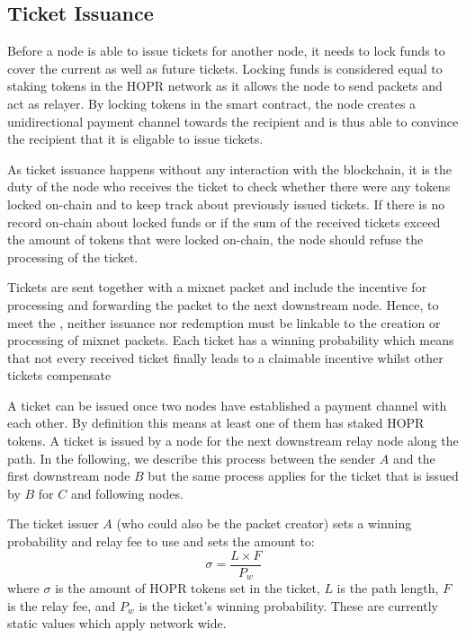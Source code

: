\subsection{Ticket Issuance}
\label{sec:tickets:issuance}

Before a node is able to issue tickets for another node, it needs to lock funds to cover the current as well as future tickets. Locking funds is considered equal to staking tokens in the HOPR network as it allows the node to send packets and act as relayer. By locking tokens in the smart contract, the node creates a unidirectional payment channel towards the recipient and is thus able to convince the recipient that it is eligable to issue tickets.

As ticket issuance happens without any interaction with the blockchain, it is the duty of the node who receives the ticket to check whether there were any tokens locked on-chain and to keep track about previously issued tickets. If there is no record on-chain about locked funds or if the sum of the received tickets exceed the amount of tokens that were locked on-chain, the node should refuse the processing of the ticket.

Tickets are sent together with a mixnet packet and include the incentive for processing and forwarding the packet to the next downstream node. Hence, to meet the , neither issuance nor redemption must be linkable to the creation or processing of mixnet packets.
Each ticket has a winning probability which means that not every received ticket finally leads to a claimable incentive whilst other tickets compensate

A ticket can be issued once two nodes have established a payment channel with each other. By definition this means at least one of them has staked HOPR tokens. A ticket is issued by a node for the next downstream relay node along the path. In the following, we describe this process between the sender $A$ and the first downstream node $B$ but the same process applies for the ticket that is issued by $B$ for $C$ and following nodes.

The ticket issuer $A$ (who could also be the packet creator) sets a winning probability and relay fee to use and sets the amount to: $$\sigma=\frac{L\times F}{P_w}$$ where $\sigma$ is the amount of HOPR tokens set in the ticket, $L$ is the path length, $F$ is the relay fee, and $P_w$ is the ticket's winning probability. These are currently static values which apply network wide.

